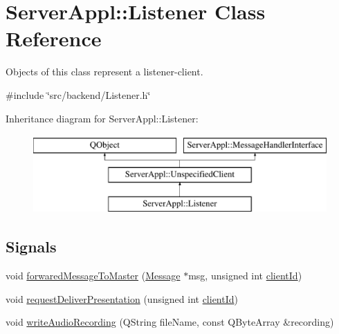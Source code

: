 \hypertarget{class_server_appl_1_1_listener}{}\section{Server\+Appl\+:\+:Listener Class Reference}
\label{class_server_appl_1_1_listener}


Objects of this class represent a listener-\/client.  




{\ttfamily \#include \char`\"{}src/backend/\+Listener.\+h\char`\"{}}

Inheritance diagram for Server\+Appl\+:\+:Listener\+:\begin{figure}[H]
\begin{center}
\leavevmode
\includegraphics[height=3.000000cm]{class_server_appl_1_1_listener}
\end{center}
\end{figure}
\subsection*{Signals}
\begin{DoxyCompactItemize}
\item 
void \hyperlink{class_server_appl_1_1_listener_af02cffd870aab335912deb5e7848c49a}{forwared\+Message\+To\+Master} (\hyperlink{class_message}{Message} $\ast$msg, unsigned int \hyperlink{class_server_appl_1_1_unspecified_client_a9a3cf2d070f19fb2bfd7d544053955b0}{client\+Id})
\item 
void \hyperlink{class_server_appl_1_1_listener_a950ec02a0b5ca19fbf46603a6af4de88}{request\+Deliver\+Presentation} (unsigned int \hyperlink{class_server_appl_1_1_unspecified_client_a9a3cf2d070f19fb2bfd7d544053955b0}{client\+Id})
\item 
void \hyperlink{class_server_appl_1_1_listener_a4f48a48f8348c388cffc0a4c6428cc0c}{write\+Audio\+Recording} (Q\+String file\+Name, const Q\+Byte\+Array \&recording)
\end{DoxyCompactItemize}
